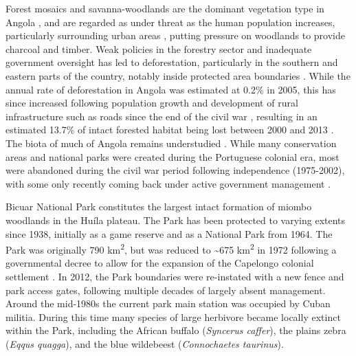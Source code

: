 \begin{refsection}
Forest mosaics and savanna-woodlands are the dominant vegetation type in Angola \citep{White1983}, and are regarded as under threat as the human population increases, particularly surrounding urban areas \citep{Ritchie2018}, putting pressure on woodlands to provide charcoal and timber. Weak policies in the forestry sector and inadequate government oversight has led to deforestation, particularly in the southern and eastern parts of the country, notably inside protected area boundaries \citep{FAO2015, Mendelsohn2019}. While the annual rate of deforestation in Angola was estimated at 0.2\% in 2005, this has since increased following population growth and development of rural infrastructure such as roads since the end of the civil war \citep{Roder2015}, resulting in an estimated 13.7\% of intact forested habitat being lost between 2000 and 2013 \citep{Potapov2017, Hansen2013}. The biota of much of Angola remains understudied \citep{Huntley2019}. While many conservation areas and national parks were created during the Portuguese colonial era, most were abandoned during the civil war period following independence (1975-2002), with some only recently coming back under active government management \citep{Huntley2019, Ministerio2006}.

Bicuar National Park constitutes the largest intact formation of miombo woodlands in the Hu\'{i}la plateau. The Park has been protected to varying extents since 1938, initially as a game reserve and as a National Park from 1964. The Park was originally 790 km\textsuperscript{2}, but was reduced to \textasciitilde{}675 km\textsuperscript{2} in 1972 following a governmental decree to allow for the expansion of the Capelongo colonial settlement \citep{Mendelsohn2019}. In 2012, the Park boundaries were re-instated with a new fence and park access gates, following multiple decades of largely absent management. Around the mid-1980s the current park main station was occupied by Cuban militia. During this time many species of large herbivore became locally extinct within the Park, including the African buffalo (\textit{Syncerus caffer}), the plains zebra (\textit{Eqqus quagga}), and the blue wildebeest (\textit{Connochaetes taurinus}).


\end{refsection}
